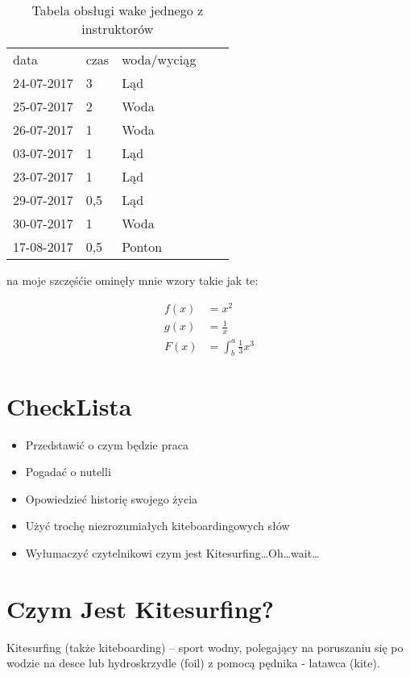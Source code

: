 \documentclass{article}
\begin{document}
	\begin{table}[]
	\centering
	\begin{tabular}{lllll}
	data       & czas & woda/wyciąg \\
	24-07-2017 & 3    & Ląd         \\
	25-07-2017 & 2    & Woda        \\
	26-07-2017 & 1    & Woda        \\
	03-07-2017 & 1    & Ląd         \\
	23-07-2017 & 1    & Ląd         \\
	29-07-2017 & 0,5  & Ląd         \\
	30-07-2017 & 1    & Woda        \\
	17-08-2017 & 0,5  & Ponton            
\end{tabular}
\caption{Tabela obsługi wake jednego z instruktorów}
\label{table:tablica2} 
\end{table}
	
	
	na moje szczęśćie ominęły mnie wzory takie jak te: 
	
	\begin{eqnarray}
			f(x) &= x^2\\
  			g(x) &= \frac{1}{x}\\
  			F(x) &= \int^a_b \frac{1}{3}x^3
	\end{eqnarray}
	
	
	

	\section{CheckLista}
	
	\begin{itemize}
	\item \makebox[1.5cm]{}Przedstawić o czym będzie praca \CheckedBox
	\item \makebox[1.5cm]{}Pogadać o nutelli \CheckedBox
	\item \makebox[1.5cm]{}Opowiedzieć historię swojego życia \CheckedBox
	\item \makebox[1.5cm]{}Użyć trochę niezrozumiałych kiteboardingowych słów \CheckedBox
	\item \makebox[1.5cm]{}Wyłumaczyć czytelnikowi czym jest Kitesurfing\dots \space Oh\dots \space wait\dots
	\end{itemize}
	
	\section{Czym Jest Kitesurfing?}
	Kitesurfing (także kiteboarding) – sport wodny, polegający na poruszaniu się po wodzie na desce lub hydroskrzydle (foil) z pomocą pędnika - latawca (kite).
\end{document}
